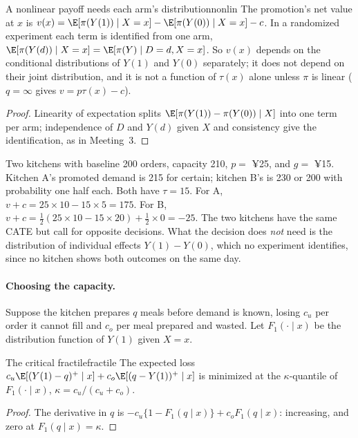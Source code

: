 \documentclass[11pt]{article}
\begin{document}
\begin{prop}{A nonlinear payoff needs each arm's distribution}{nonlin}
The promotion's net value at $x$ is $v(x) = \E[\pi(Y(1)) \mid X = x] - \E[\pi(Y(0)) \mid X = x] - c$. In a randomized experiment
each term is identified from one arm, $\E[\pi(Y(d)) \mid X = x] = \E[\pi(Y) \mid D = d, X = x]$. So $v(x)$ depends on the
conditional distributions of $Y(1)$ and $Y(0)$ separately; it does not depend on their joint distribution, and it is not
a function of $\tau(x)$ alone unless $\pi$ is linear ($q = \infty$ gives $v = p\tau(x) - c$).
\end{prop}
\begin{proof}
Linearity of expectation splits $\E[\pi(Y(1)) - \pi(Y(0)) \mid X]$ into one term per arm; independence of $D$ and $Y(d)$ given $X$
and consistency give the identification, as in Meeting~3.
\end{proof}

Two kitchens with baseline 200 orders, capacity 210, $p = $ ¥25, and $g = $ ¥15. Kitchen A's promoted demand is 215 for
certain; kitchen B's is 230 or 200 with probability one half each. Both have $\tau = 15$. For A,
$v + c = 25 \times 10 - 15 \times 5 = 175$. For B, $v + c = \tfrac12(25 \times 10 - 15 \times 20) + \tfrac12 \times 0 = -25$. The two
kitchens have the same CATE but call for opposite decisions. What the decision does \emph{not} need is the distribution of individual effects $Y(1) - Y(0)$, which no
experiment identifies, since no kitchen shows both outcomes on the same day.

\paragraph{Choosing the capacity.} Suppose the kitchen prepares $q$ meals before demand is known, losing $c_u$ per order it
cannot fill and $c_o$ per meal prepared and wasted. Let $F_1(\cdot \mid x)$ be the distribution function of $Y(1)$ given $X = x$.

\begin{prop}{The critical fractile}{fractile}
The expected loss $c_u\E[(Y(1) - q)^+ \mid x] + c_o\E[(q - Y(1))^+ \mid x]$ is minimized at the $\kappa$-quantile of $F_1(\cdot \mid x)$,
$\kappa = c_u/(c_u + c_o)$.
\end{prop}
\begin{proof}
The derivative in $q$ is $-c_u\{1 - F_1(q \mid x)\} + c_oF_1(q \mid x)$: increasing, and zero at $F_1(q \mid x) = \kappa$.
\end{proof}
\end{document}
